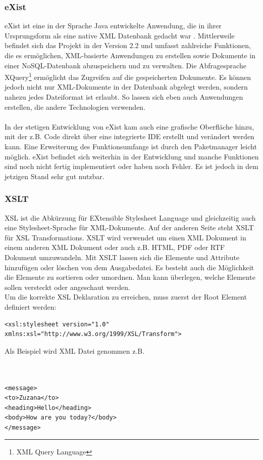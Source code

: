 \subsubsection{eXist}
\label{subsec:eXist}
eXist \cite{existwebsite} ist eine in der Sprache Java entwickelte Anwendung, die in ihrer Ursprungsform als eine native XML Datenbank gedacht war \cite{siegel:exist}. Mittlerweile befindet sich das Projekt in der Version 2.2 und umfasst zahlreiche Funktionen, die es ermöglichen, XML-basierte Anwendungen zu erstellen sowie Dokumente in einer NoSQL-Datenbank abzuspeichern und zu verwalten. Die Abfragesprache XQuery\footnote[1]{XML Query Language} ermöglicht das Zugreifen auf die gespeicherten Dokumente. Es können jedoch nicht nur XML-Dokumente in der Datenbank abgelegt werden, sondern nahezu jedes Dateiformat ist erlaubt. So lassen sich eben auch Anwendungen erstellen, die andere Technologien verwenden.
\\
\\
In der stetigen Entwicklung von eXist kam auch eine grafische Oberfläche hinzu, mit der z.B. Code direkt über eine integrierte IDE erstellt und verändert werden kann. Eine Erweiterung des Funktionsumfangs ist durch den Paketmanager leicht möglich. eXist befindet sich weiterhin in der Entwicklung und manche Funktionen sind noch nicht fertig implementiert oder haben noch Fehler. Es ist jedoch in dem jetzigen Stand sehr gut nutzbar.

\subsubsection{XSLT}
\label{subsec:XSLT}
XSL ist die Abkürzung für EXtensible Stylesheet Language und gleichzeitig auch eine Stylesheet-Sprache für XML-Dokumente. Auf der anderen Seite steht XSLT \cite{xsltwebsite} für XSL Transformations. XSLT wird verwendet um einen XML Dokument in einem anderen XML Dokument oder auch z.B. HTML, PDF oder RTF Dokument umzuwandeln.
Mit XSLT lassen sich die Elemente und Attribute hinzufügen oder löschen von dem Ausgabedatei. Es besteht auch die Möglichkeit die Elemente zu sortieren oder umordnen. Man kann überlegen, welche Elemente sollen versteckt oder angeschaut werden.
\\
Um die korrekte XSL Deklaration zu erreichen, muss zuerst der Root Element definiert werden:  
\begin{lstlisting}
<xsl:stylesheet version="1.0"
xmlns:xsl="http://www.w3.org/1999/XSL/Transform">
\end{lstlisting}
Als Beispiel wird XML Datei genommen z.B.
\\
\\
\\
\begin{lstlisting}
<message>
<to>Zuzana</to>
<heading>Hello</heading>
<body>How are you today?</body>
</message>
\end{lstlisting}


